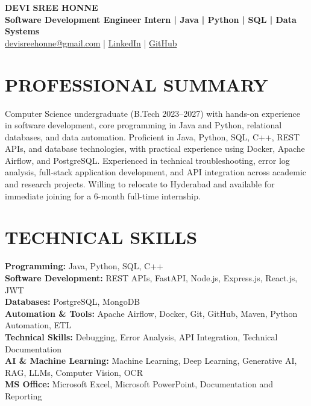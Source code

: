 \documentclass[a4paper,10pt]{article}
\begin{document}
\begin{center}
    {\LARGE \textbf{DEVI SREE HONNE}}\\[4pt]

    {\normalsize
    \textbf{Software Development Engineer Intern | Java | Python | SQL | Data Systems}
    }\\[5pt]

    \small
    \href{mailto:devisreehonne@gmail.com}
    {devisreehonne@gmail.com}
    \quad | \quad
    \href{https://www.linkedin.com/in/devisreehonne/}
    {LinkedIn}
    \quad | \quad
    \href{https://github.com/devhonne}
    {GitHub}
\end{center}

\section*{PROFESSIONAL SUMMARY}

Computer Science undergraduate (B.Tech 2023--2027) with hands-on experience in software development, core programming in Java and Python, relational databases, and data automation. Proficient in Java, Python, SQL, C++, REST APIs, and database technologies, with practical experience using Docker, Apache Airflow, and PostgreSQL. Experienced in technical troubleshooting, error log analysis, full-stack application development, and API integration across academic and research projects. Willing to relocate to Hyderabad and available for immediate joining for a 6-month full-time internship.

\section*{TECHNICAL SKILLS}

\textbf{Programming:} Java, Python, SQL, C++\\
\textbf{Software Development:} REST APIs, FastAPI, Node.js, Express.js, React.js, JWT\\
\textbf{Databases:} PostgreSQL, MongoDB\\
\textbf{Automation \& Tools:} Apache Airflow, Docker, Git, GitHub, Maven, Python Automation, ETL\\
\textbf{Technical Skills:} Debugging, Error Analysis, API Integration, Technical Documentation\\
\textbf{AI \& Machine Learning:} Machine Learning, Deep Learning, Generative AI, RAG, LLMs, Computer Vision, OCR\\
\textbf{MS Office:} Microsoft Excel, Microsoft PowerPoint, Documentation and Reporting
\end{document}
